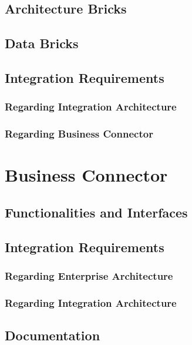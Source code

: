 \documentclass[
     12pt,         %
     a4paper,      %
     BCOR=10mm,version=first,     %
     DIV=14,version=first,        %
     ]{scrreprt}
\begin{document}
\subsection{Architecture Bricks}

\subsection{Data Bricks}

\subsection{Integration Requirements}

\subsubsection{Regarding Integration Architecture}

\subsubsection{Regarding Business Connector}



\section{Business Connector}

\subsection{Functionalities and Interfaces}

\subsection{Integration Requirements}

\subsubsection{Regarding Enterprise Architecture}

\subsubsection{Regarding Integration Architecture}

\subsection{Documentation}
\end{document}
